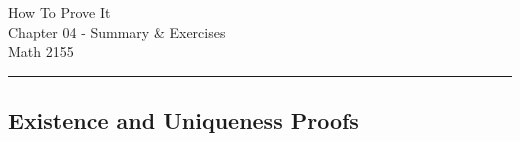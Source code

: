 \documentclass[12pt,letterpaper]{exam}
\begin{document}
\begingroup  
    \centering
    \LARGE How To Prove It\\
    \LARGE Chapter 04 - Summary \& Exercises\\[0.5em]
    \large Math 2155\\[0.5em]
\endgroup
\rule{\textwidth}{0.4pt}
\pointsdroppedatright   %
\printanswers

\renewcommand{\solutiontitle}{\noindent\textbf{Ans}\enspace}   %

\setcounter{section}{3}

\subsection{}
\subsection{}
\subsection{}
\subsection{}
\subsection{Existence and Uniqueness Proofs}
\end{document}
